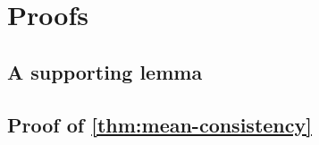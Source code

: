 \section{Proofs}
\label{sec:proofs}

\subsection{A supporting lemma}



\subsection{Proof of \autoref{thm:mean-consistency}}
\label{pf:mean-consistency}

